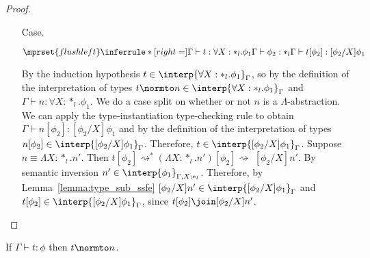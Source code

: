 \begin{proof}
\begin{itemize}
\item[Case.]\ \\
  \begin{center}
    \begin{math}
      $$\mprset{flushleft}
      \inferrule* [right=] {
        \Gamma \vdash t:\forall X:*_l.\phi_1
        \\
        \Gamma \vdash \phi_2:*_l
      }{\Gamma \vdash t[\phi_2]: [\phi_2/X]\phi_1}
    \end{math}
  \end{center}
  By the induction hypothesis $t \in \interp{\forall X:*_l.\phi_1}_\Gamma$, so by the 
  definition of the interpretation of types 
  $t \normto n \in \interp{\forall X:*_l.\phi_1}_\Gamma$ and
  $\Gamma \vdash n:\forall X:*_l.\phi_1$.  We do a case 
  split on whether or not $n$ is a $\Lambda$-abstraction. We can apply the
  type-instantiation type-checking rule to obtain 
  $\Gamma \vdash n[\phi_2]:[\phi_2/X]\phi_1$ and by the 
  definition of the interpretation of types 
  $n[\phi_2] \in \interp{[\phi_2/X]\phi_1}_\Gamma$. Therefore, 
  $t \in \interp{[\phi_2/X]\phi_1}_\Gamma$.  Suppose $n \equiv \Lambda X:*_l.n'$.  
  Then 
  $t[\phi_2] \rightsquigarrow^{*} (\Lambda X:*_l.n')[\phi_2] \rightsquigarrow $
  $ [\phi_2/X]n'$.  By semantic inversion
  $n' \in \interp{\phi_1}_{\Gamma,X:*_l}$. Therefore, by
  Lemma~\ref{lemma:type_sub_ssfe} $[\phi_2/X]n' \in \interp{[\phi_2/X]\phi_1}_{\Gamma}$ and
  $t[\phi_2] \in \interp{[\phi_2/X]\phi_1}_{\Gamma}$, since $t[\phi_2] \join [\phi_2/X]n'$.
\end{itemize}
\end{proof}
\begin{corollary}[Normalization]
  If $\Gamma \vdash t:\phi$ then $t \normto n$.
\end{corollary}
